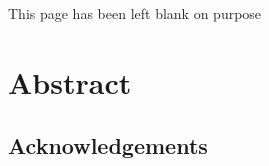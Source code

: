 \documentclass[12pt]{article}
\numberwithin{equation}{section}
\numberwithin{table}{section}
\numberwithin{figure}{section}
\begin{document}
\newpage
\onehalfspacing
\begin{center}
 This page has been left blank on purpose   
\end{center}

\newpage
\section*{Abstract}
\lipsum[1]

\newpage
\begin{doublespace}
\begin{center}
    \section*{Acknowledgements}
\end{center} 
\lipsum[1]
\end{doublespace}

\newpage
\tableofcontents
\listoftables
\listoffigures

\newpage
{}
\pagestyle{fancy}

\newpage
\pagestyle{fancy}

\newpage
\pagestyle{fancy}

\newpage
\pagestyle{fancy}


\newpage
\pagestyle{fancy}




\newpage

\pagestyle{fancy}

\newpage
\appendix 

\end{document}
